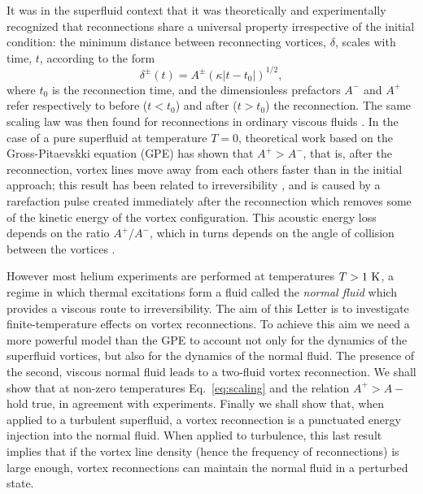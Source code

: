 \documentclass[%
 reprint,
 amsmath,amssymb,
 aps,
 prl,
]{revtex4-2}
\begin{document}
It was in the superfluid context that it was theoretically and
experimentally recognized
\cite{nazarenko2003,bewley2008,paoletti2010,zuccherQuantumVortexReconnections2012a,villoisUniversalNonuniversalAspects2017a,galantucciCrossoverInteractionDriven2019a}
that reconnections share a universal property irrespective of the initial
condition: the minimum distance between reconnecting 
vortices, $\delta$, scales with time, $t$, according to the form
\begin{equation}
\label{eq:scaling}
	\delta^{\pm}(t) = A^{\pm} (\kappa|t-t_0|)^{1/2},
\end{equation} 
\noindent
where $t_0$ is the reconnection time, and the dimensionless
prefactors $A^-$ and $A^+$ refer respectively to before
($t<t_0$) and after ($t>t_0$) the reconnection. The same scaling law
was then found for reconnections in ordinary viscous fluids 
\cite{yaoSeparationScalingViscous2020}. In the case of a pure
superfluid at temperature $T=0$, theoretical work based on
the Gross-Pitaevskki equation (GPE) has shown that
$A^+>A^-$, that is, after the reconnection, vortex lines move away from 
each others faster than in the initial approach; this result has been
related to irreversibility \cite{villoisIrreversibleDynamicsVortex2020},
and is caused by a rarefaction pulse created immediately after the reconnection\cite{leadbeaterSoundEmissionDue2001b,zuccherQuantumVortexReconnections2012a} which
removes some of the kinetic energy of the vortex configuration.
This acoustic energy loss depends on
the ratio $A^+/A^-$, which in turns depends on the angle of collision
between the vortices \cite{villoisIrreversibleDynamicsVortex2020}. 

However most helium experiments
are performed at temperatures $T>1~\rm K$, a regime in which thermal 
excitations form a fluid called the {\it normal fluid} which provides a viscous
route to irreversibility. The aim of this Letter is to investigate
finite-temperature effects on vortex reconnections. 
To achieve this aim we need a more powerful
model than the GPE to account not only for the dynamics of the
superfluid vortices, but also for the dynamics of the normal fluid. The presence of the second, viscous normal fluid leads to a two-fluid vortex reconnection.
We shall show that at non-zero temperatures Eq.~\ref{eq:scaling} and the
relation $A^+>A-$ hold true, in agreement with experiments. Finally we shall
show that, when applied to a turbulent superfluid, a vortex
reconnection is a punctuated energy injection into the normal fluid.
When applied to turbulence, this last result implies that if the vortex line density (hence the frequency of reconnections) is large enough, vortex
reconnections can maintain the normal fluid in a perturbed state.
\end{document}
